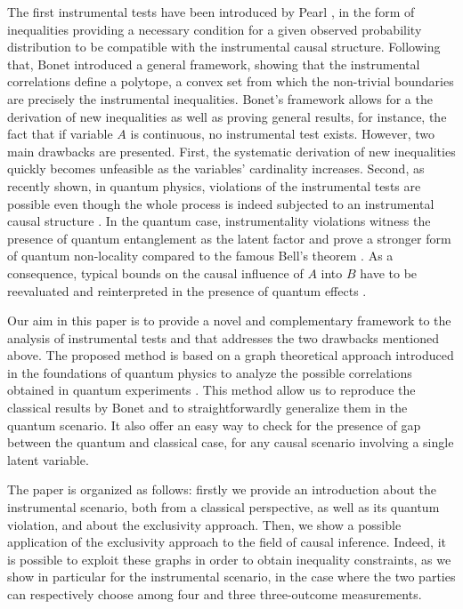 \documentclass[letterpaper]{article}
\begin{document}
The first instrumental tests have been introduced by Pearl \cite{pearl1995}, in
the form of inequalities providing a necessary condition for a given observed
probability distribution to be compatible with the instrumental causal
structure. Following that, Bonet \cite{bonet2001} introduced a general
framework, showing that the instrumental correlations define a polytope, a
convex set from which the non-trivial boundaries are precisely the instrumental
inequalities. Bonet's framework allows for a the derivation of new inequalities
as well as proving general results, for instance, the fact that if variable $A$
is continuous, no instrumental test exists. However, two main drawbacks are
presented. First, the systematic derivation of new inequalities quickly becomes
unfeasible as the variables' cardinality increases. Second, as recently shown,
in quantum physics, violations of the instrumental tests are possible even
though the whole process is indeed subjected to an instrumental causal structure
\cite{chaves2018, himbeeck2018}. In the quantum case, instrumentality violations
witness the presence of quantum entanglement as the latent factor and prove a
stronger form of quantum non-locality compared to the famous Bell's theorem
\cite{chaves2018}. As a consequence, typical bounds on the causal influence of
$A$ into $B$ have to be reevaluated and reinterpreted in the presence of quantum
effects \cite{}.%

Our aim in this paper is to provide a novel and complementary framework to the
analysis of instrumental tests and that addresses the two drawbacks mentioned
above. The proposed method is based on a graph theoretical approach introduced
in the foundations of quantum physics to analyze the possible correlations
obtained in quantum experiments \cite{}. %
This method allow us to reproduce the classical results by Bonet and to
straightforwardly generalize them in the quantum scenario. 
It also offer an easy way to check for the presence of gap between the
quantum and classical case, for any causal scenario involving a single latent
variable.

The paper is organized as follows: firstly we provide an introduction about the
instrumental scenario, both from a classical perspective, as well as its quantum
violation, and about the exclusivity approach. Then, we show a possible
application of the exclusivity approach to the field of causal inference.
Indeed, it is possible to exploit these graphs in order to obtain inequality
constraints, as we show in particular for the instrumental scenario, in the case
where the two parties can respectively choose among four and three three-outcome
measurements.
\end{document}
